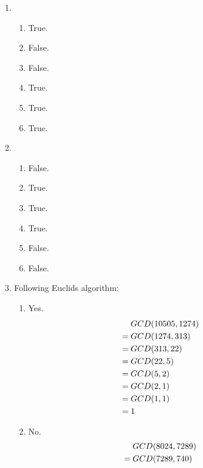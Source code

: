 \documentclass[11pt]{article}
\begin{document}
\begin{enumerate}[7.1]
  \item
  \begin{enumerate}
    \item True.
    \item False.
    \item False.
    \item True.
    \item True.
    \item True.
  \end{enumerate}
  \item
  \begin{enumerate}
    \item False.
    \item True.
    \item True.
    \item True.
    \item False.
    \item False.
  \end{enumerate}
  \item Following Euclids algorithm:
  \begin{enumerate}
  \item Yes.
    \begin{align*}
                       & GCD(10505, 1274) & \\
      =\hspace{0.25em} & GCD(1274, 313)   & \\
      =\hspace{0.25em} & GCD(313, 22)     & \\
      =\hspace{0.25em} & GCD(22, 5)       & \\
      =\hspace{0.25em} & GCD(5, 2)        & \\
      =\hspace{0.25em} & GCD(2, 1 )       & \\
      =\hspace{0.25em} & GCD(1, 1)        & \\
      =\hspace{0.25em} & 1                & \\
    \end{align*}
  \item No.
    \begin{align*}
                       & GCD(8024, 7289) & \\
      =\hspace{0.25em} & GCD(7289, 740)  & \\

\end{align*}
\end{enumerate}
\end{enumerate}
\end{document}
